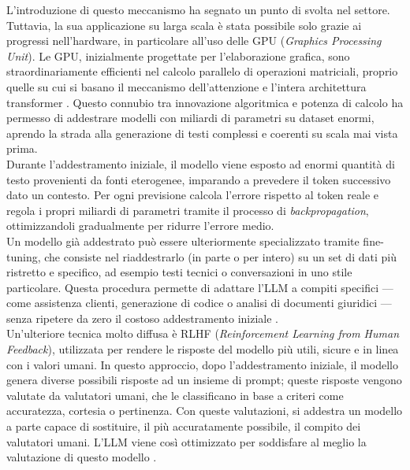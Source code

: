 L'introduzione di questo meccanismo ha segnato un punto di svolta nel settore. Tuttavia, la sua applicazione su larga scala è stata possibile solo grazie ai progressi nell'hardware, in particolare all'uso delle GPU (\textit{Graphics Processing Unit}). Le GPU, inizialmente progettate per l'elaborazione grafica, sono straordinariamente efficienti nel calcolo parallelo di operazioni matriciali, proprio quelle su cui si basano il meccanismo dell'attenzione e l'intera architettura transformer \cite{transformer_parallelizable}. Questo connubio tra innovazione algoritmica e potenza di calcolo ha permesso di addestrare modelli con miliardi di parametri su dataset enormi, aprendo la strada alla generazione di testi complessi e coerenti su scala mai vista prima. \\
Durante l'addestramento iniziale, il modello viene esposto ad enormi quantità di testo provenienti da fonti eterogenee, imparando a prevedere il token successivo dato un contesto. Per ogni previsione calcola l'errore rispetto al token reale e regola i propri miliardi di parametri tramite il processo di \textit{backpropagation}, ottimizzandoli gradualmente per ridurre l'errore medio. \\
Un modello già addestrato può essere ulteriormente specializzato tramite fine-tuning, che consiste nel riaddestrarlo (in parte o per intero) su un set di dati più ristretto e specifico, ad esempio testi tecnici o conversazioni in uno stile particolare. Questa procedura permette di adattare l'LLM a compiti specifici — come assistenza clienti, generazione di codice o analisi di documenti giuridici — senza ripetere da zero il costoso addestramento iniziale \cite{fine_tuning_transfer_learning}. \\
Un'ulteriore tecnica molto diffusa è RLHF (\textit{Reinforcement Learning from Human Feedback}), utilizzata per rendere le risposte del modello più utili, sicure e in linea con i valori umani. In questo approccio, dopo l'addestramento iniziale, il modello genera diverse possibili risposte ad un insieme di prompt; queste risposte vengono valutate da valutatori umani, che le classificano in base a criteri come accuratezza, cortesia o pertinenza. Con queste valutazioni, si addestra un modello a parte capace di sostituire, il più accuratamente possibile, il compito dei valutatori umani. L'LLM viene così ottimizzato per soddisfare al meglio la valutazione di questo modello \cite{RLHF_reward_model_from_humans}.

